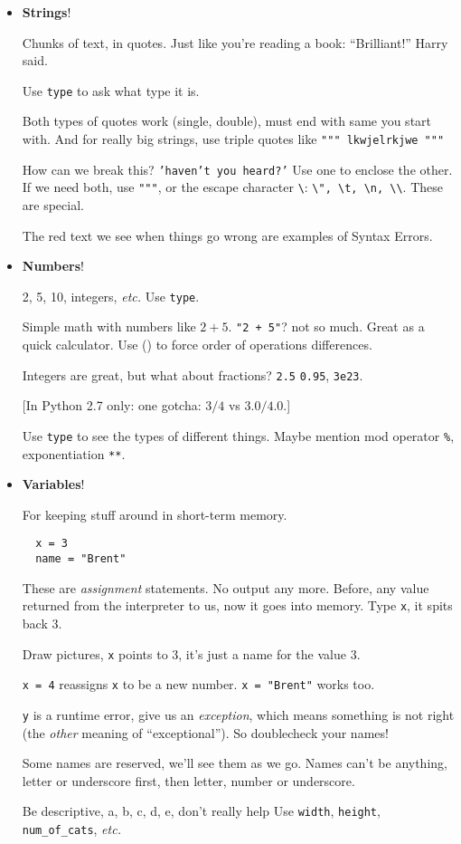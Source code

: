 \documentclass{article}
\newcommand{\etc}{\emph{etc.}\xspace}
\begin{document}
\begin{itemize}
\item \textbf{Strings}!

  Chunks of text, in quotes. Just like you're reading a book:
  ``Brilliant!'' Harry said.

  Use \texttt{type} to ask what type it is.

  Both types of quotes work (single, double), must end with same you
  start with. And for really big strings, use triple quotes like
  \texttt{""" lkwjelrkjwe """}

  How can we break this? \texttt{'haven't you heard?'}  Use one to
  enclose the other.  If we need both, use \texttt{"""}, or the escape
  character \texttt{\textbackslash}: \texttt{\textbackslash ", \textbackslash t,
    \textbackslash n, \textbackslash\textbackslash}. These are special.

  The red text we see when things go wrong are examples of Syntax
  Errors.

\item \textbf{Numbers}!

  2, 5, 10, integers, \etc  Use \texttt{type}.

  Simple math with numbers like $2+5$. \texttt{"2 + 5"}? not so much.
  Great as a quick calculator. Use () to force order of operations
  differences.

  Integers are great, but what about fractions? \texttt{2.5}
  \texttt{0.95}, \texttt{3e23}.

  [In Python 2.7 only: one gotcha: $3 / 4$ vs $3.0 / 4.0$.]

  Use \verb|type| to see the types of different things.  Maybe mention
  mod operator \verb|%|, exponentiation \verb|**|.

\item \textbf{Variables}!

  For keeping stuff around in short-term memory.
  \begin{verbatim}
  x = 3
  name = "Brent"
  \end{verbatim}
  These are \emph{assignment} statements.  No output any more. Before,
  any value returned from the interpreter to us, now it goes into
  memory.  Type \texttt{x}, it spits back 3.

  Draw pictures, \texttt{x} points to $3$, it's just a name for the
  value $3$.

  \texttt{x = 4} reassigns \texttt{x} to be a new number.  \texttt{x =
    "Brent"} works too.

  \texttt{y} is a runtime error, give us an \emph{exception}, which
  means something is not right (the \emph{other} meaning of
  ``exceptional''). So doublecheck your names!

  Some names are reserved, we'll see them as we go.
  Names can't be anything, letter or underscore first, then letter,
  number or underscore.

  Be descriptive, a, b, c, d, e, don't really help
  Use \texttt{width}, \texttt{height}, \texttt{num\_of\_cats}, \etc
\end{itemize}
\end{document}
